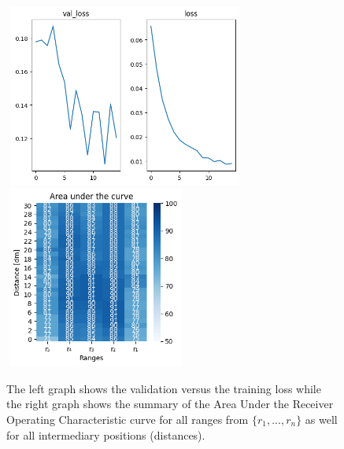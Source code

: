 \begin{multicols}{2}
\begin{itemize}
\end{itemize}
\end{multicols}\begin{figure}[H]%
\centering
\includegraphics[width=8cm,height=6cm]{3_models/models_27/graph_27.png}
\hspace{0.2 cm}
\includegraphics[width=6cm,height=6cm]{4_plots/plots_27/AUC_27.png}
\caption{The left graph shows the validation versus the training loss while the right graph shows the summary of the Area Under the Receiver Operating Characteristic curve for all ranges from $\{r_{1}, ... ,r_{n}\}$ as well for all intermediary positions (distances).}
\label{auc_27}
\end{figure}


\newpage
